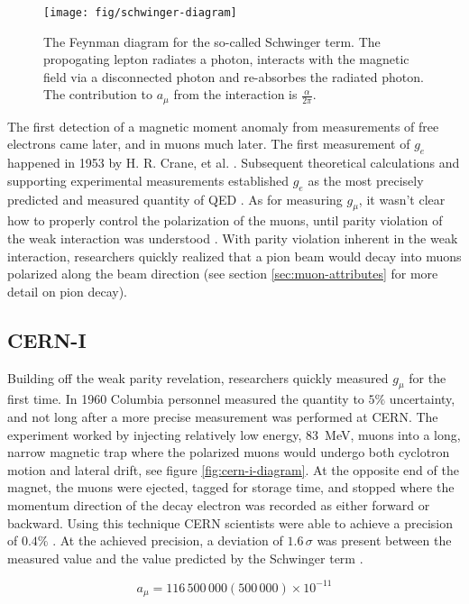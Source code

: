 \begin{figure}
\centering
\texttt{[image: fig/schwinger-diagram]}
\caption{The Feynman diagram for the so-called Schwinger term. The propogating lepton radiates a photon, interacts with the magnetic field via a disconnected photon and re-absorbes the radiated photon.  The contribution to $a_\mu$ from the interaction is $\frac{\alpha}{2\pi}$. \label{fig:schwinger-diagram}}
\end{figure}

The first detection of a magnetic moment anomaly from measurements of free electrons came later, and in muons much later.  The first measurement of $g_e$ happened in 1953 by H. R. Crane, et al. \cite{g-e-crane}.  Subsequent theoretical calculations and supporting experimental measurements established $g_e$ as the most precisely predicted and measured quantity of QED \cite{g-e-measurement}.  As for measuring $g_\mu$, it wasn't clear how to properly control the polarization of the muons, until parity violation of the weak interaction was understood \cite{lee-yang, wu-expt}.  With parity violation inherent in the weak interaction, researchers quickly realized that a pion beam would decay into muons polarized along the beam direction (see section \ref{sec:muon-attributes} for more detail on pion decay).

\subsection{CERN-I}
Building off the weak parity revelation, researchers quickly measured $g_\mu$ for the first time.  In 1960 Columbia personnel measured the quantity to $5\%$ uncertainty, and not long after a more precise measurement was performed at CERN.  The experiment worked by injecting relatively low energy, \SI{83}{\MeV}, muons into a long, narrow magnetic trap where the polarized muons would undergo both cyclotron motion and lateral drift, see figure \ref{fig:cern-i-diagram}. At the opposite end of the magnet, the muons were ejected, tagged for storage time, and stopped where the momentum direction of the decay electron was recorded as either forward or backward.  Using this technique CERN scientists were able to achieve a precision of $0.4\%$ \cite{cern-i}.  At the achieved precision, a deviation of $1.6\,\sigma$ was present between the measured value and the value predicted by the Schwinger term \cite{47y-muon-g-2}.

\begin{equation}
\label{eqn:cern-i-results}
a_\mu = 116\,500\,000 (500\,000) \times 10^{-11}
\end{equation}

